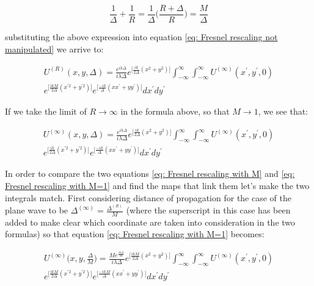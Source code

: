\documentclass{iucr}              %
\begin{document}
\begin{equation}
	\frac{1}{\Delta}+\frac{1}{R} = \frac{1}{\Delta}\Big(\frac{R+\Delta}{R}\Big)=\frac{M}{\Delta}
\end{equation}

substituting the above expression into equation \ref{eq: Fresnel rescaling not manipulated} we arrive to:

\begin{multline}\label{eq: Fresnel rescaling with M}
U^{(R)}(x, y, \Delta)=\frac {e^{ik\Delta}}{ i \lambda \Delta} e^{\big[\frac{ik}{2\Delta}(x^2+y^2)\big]} \int_{-\infty}^{\infty} \int_{-\infty}^{\infty} U^{(\infty)}(x^\prime, y^\prime, 0)\\
e^{\big[\frac{ikM}{2\Delta}(x^{\prime 2}+y^{\prime 2})\big]}e^{\big[\frac{-ik}{\Delta}(xx^{\prime}+yy^{\prime})\big]} dx^\prime dy^\prime
\end{multline}

If we take the limit of $R\rightarrow\infty$ in the formula above, so that $M\rightarrow 1$, we see that:

\begin{multline}\label{eq: Fresnel rescaling with M=1}
U^{(\infty)}(x, y, \Delta)=\frac {e^{ik\Delta}}{ i \lambda \Delta} e^{\big[\frac{ik}{2\Delta}(x^2+y^2)\big]} \int_{-\infty}^{\infty} \int_{-\infty}^{\infty} U^{(\infty)}(x^\prime, y^\prime, 0)\\
e^{\big[\frac{ik}{2\Delta}(x^{\prime 2}+y^{\prime 2})\big]}e^{\big[\frac{-ik}{\Delta}(xx^{\prime}+yy^{\prime})\big]} dx^\prime dy^\prime
\end{multline}

In order to compare the two equations \ref{eq: Fresnel rescaling with M} and \ref{eq: Fresnel rescaling with M=1} and find the maps that link them let's make the two integrals match. First considering distance of propagation for the case of the plane wave to be $\Delta^{(\infty)}=\frac{\Delta^{(R)}}{M}$ (where the superscript in this case has been added to make clear which coordinate are taken into consideration in the two formulas) so that equation \ref{eq: Fresnel rescaling with M=1} becomes:

\begin{multline}\label{eq: Fresnel rescaling with M=1 and delta/M}
U^{(\infty)}\Big(x, y, \frac{\Delta}{M}\Big)=\frac {Me^{\frac{ik\Delta}{M}}}{ i \lambda \Delta} e^{\big[\frac{ikM}{2\Delta}(x^2+y^2)\big]} \int_{-\infty}^{\infty} \int_{-\infty}^{\infty} U^{(\infty)}(x^\prime, y^\prime, 0)\\
e^{\big[\frac{ikM}{2\Delta}(x^{\prime 2}+y^{\prime 2})\big]}e^{\big[\frac{-ikM}{\Delta}(xx^{\prime}+yy^{\prime})\big]} dx^\prime dy^\prime
\end{multline}
\end{document}
